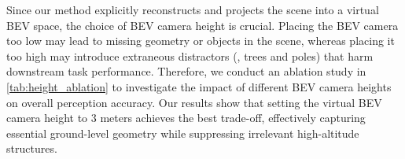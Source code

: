 Since our method explicitly reconstructs and projects the scene into a virtual BEV space, the choice of BEV camera height is crucial. 
Placing the BEV camera too low may lead to missing geometry or objects in the scene, whereas placing it too high may introduce extraneous distractors (\eg, trees and poles) that harm downstream task performance.
Therefore, we conduct an ablation study in \cref{tab:height_ablation} to investigate the impact of different BEV camera heights on overall perception accuracy.
Our results show that setting the virtual BEV camera height to 3 meters achieves the best trade-off, effectively capturing essential ground-level geometry while suppressing irrelevant high-altitude structures.





